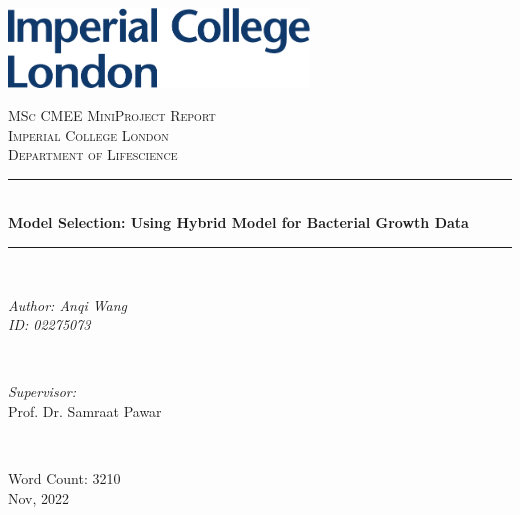 \documentclass[a4paper]{report}
\begin{document}
    \begin{titlepage}

    \newcommand{\HRule}{\rule{\linewidth}{0.5mm}} %

    \includegraphics[width=8cm]{../data/logo.pdf}\\[1cm]
    

    \center %

    \textsc{\LARGE MSc CMEE MiniProject Report}\\[1.5cm]
    \textsc{\Large Imperial College London}\\[0.5cm] 
    \textsc{\large Department of Lifescience}\\[0.5cm] 

    \makeatletter
    \HRule \\[0.4cm]
    { \huge \bfseries Model Selection: Using Hybrid Model for Bacterial Growth Data}\\[0.5 cm] %
    \HRule \\[1.75cm]

    \begin{minipage}{0.4\textwidth}
    \begin{flushleft} \large
    \emph{Author: Anqi Wang} \\[1.2em]
    \emph{ID: 02275073} \\
    \end{flushleft}
    \end{minipage}
    ~
    \begin{minipage}{0.4\textwidth}
    \begin{flushright} \large
    \emph{Supervisor:}\\
    Prof. Dr. Samraat Pawar\\
    \end{flushright}
    \end{minipage}\\[2cm]
    \makeatother

    {\large Word Count: 3210}\\[2cm]
    {\large Nov, 2022}\\[2cm] 

    \vfill %

    \end{titlepage}
    
\end{document}
